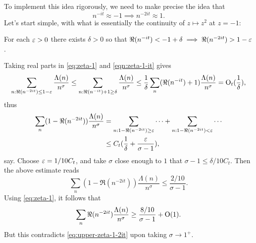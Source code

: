 \documentclass[reqno]{amsart} 
\begin{document}
To implement this idea rigorously, we need to make precise the idea that
\begin{equation}
  n^{-i t} \approx -1 \implies n^{-2 i t} \approx 1. 
\end{equation}
Let's start simple, with what is essentially the continuity of $z \mapsto z^2$ at $z = -1$:
\begin{center}
  For each $\varepsilon > 0$ there exists $\delta > 0$ so that $\Re(n^{-it}) < -1 + \delta \implies \Re(n^{-2 i t}) > 1 - \varepsilon$.
\end{center}
Taking real parts in \eqref{eq:zeta-1} and \eqref{eqn:zeta-1-it} gives
\begin{equation}
\sum_{n : \Re(n^{-2 i t}) \leq 1 - \varepsilon } \frac{\Lambda(n)}{n^\sigma } \leq \sum_{n : \Re(n^{-i t}) + 1 \geq \delta } \frac{\Lambda(n)}{n^\sigma } \leq \frac{1}{\delta } \sum_n (\Re( n^{-i t}) + 1) \frac{\Lambda(n)}{n^\sigma } = \operatorname{O}_t(\frac{1}{\delta }),
\end{equation}
thus
\begin{align}\label{eq:}
  \sum_{n}
  (1 - \Re(n^{-2 i t}))
  \frac{\Lambda(n)}{n^\sigma }
  &=
                                                                                                            \sum_{n : 1 - \Re(n^{-2 it}) \geq \varepsilon}
                                                                                                            \dotsb
                                                                                                            + 
                                                                                                            \sum_{n : 1 - \Re(n^{-2 it}) < \varepsilon}
                                                                                                            \dotsb
  \\
                                                                                                         &\leq
                                                                                                            C_t (\frac{1}{\delta } + \frac{\varepsilon }{\sigma - 1}),
\end{align}
say.  Choose $\varepsilon = 1 / 10 C_t$, and take $\sigma$ close enough to $1$ that $\sigma - 1 \leq \delta/10 C_t$.  Then the above estimate reads
\begin{equation}\label{eq:}
  \sum_{n}
  (1 - \Re(n^{-2 i t}))
  \frac{\Lambda(n)}{n^\sigma }
  \leq
  \frac{2/10}{\sigma - 1}.
\end{equation}
Using \eqref{eq:zeta-1}, it follows that
\begin{equation}
  \sum_{n}
  \Re(n^{-2 i t})
  \frac{\Lambda(n)}{n^\sigma }
  \geq
  \frac{8/10}{\sigma - 1} + \operatorname{O}(1).
\end{equation}
But this contradicts \eqref{eq:upper-zeta-1-2it} upon taking $\sigma \rightarrow 1^+$.
\end{document}
